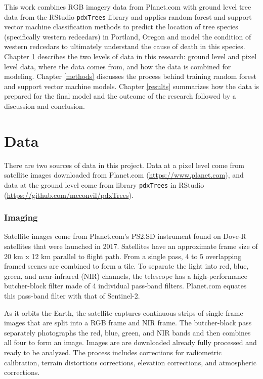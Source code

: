 \documentclass[12pt,twoside]{reedthesis}
\begin{document}
This work combines RGB imagery data from Planet.com with ground level tree data from the RStudio \texttt{pdxTrees} library and applies random forest and support vector machine classification methods to predict the location of tree species (specifically western redcedars) in Portland, Oregon and model the condition of western redcedars to ultimately understand the cause of death in this species. Chapter \ref{data} describes the two levels of data in this research: ground level and pixel level data, where the data comes from, and how the data is combined for modeling. Chapter \ref{methods} discusses the process behind training random forest and support vector machine models. Chapter \ref{results} summarizes how the data is prepared for the final model and the outcome of the research followed by a discussion and conclusion.

\hypertarget{data}{%
\chapter{Data}\label{data}}

There are two sources of data in this project. Data at a pixel level come from satellite images downloaded from Planet.com (\url{https://www.planet.com}), and data at the ground level come from library \texttt{pdxTrees} in RStudio (\url{https://github.com/mcconvil/pdxTrees}).

\hypertarget{imaging}{%
\subsection{Imaging}\label{imaging}}

Satellite images come from Planet.com's PS2.SD instrument found on Dove-R satellites that were launched in 2017. Satellites have an approximate frame size of 20 km x 12 km parallel to flight path. From a single pass, 4 to 5 overlapping framed scenes are combined to form a tile. To separate the light into red, blue, green, and near-infrared (NIR) channels, the telescope has a high-performance butcher-block filter made of 4 individual pass-band filters. Planet.com equates this pass-band filter with that of Sentinel-2.

As it orbits the Earth, the satellite captures continuous strips of single frame images that are split into a RGB frame and NIR frame. The butcher-block pass separately photographs the red, blue, green, and NIR bands and then combines all four to form an image. Images are are downloaded already fully processed and ready to be analyzed. The process includes corrections for radiometric calibration, terrain distortions corrections, elevation corrections, and atmospheric corrections.
\end{document}
